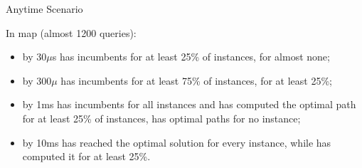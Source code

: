\begin{frame}{Anytime Scenario}

    In  map (almost 1200 queries):

    \begin{itemize}
        \item by 30$\mu$s \anytimeCPDSearch{} has incumbents for at least 25\% of instances, \AWA{} for almost none;
        \item by 300$\mu$ \anytimeCPDSearch{} has incumbents for at least 75\% of instances, \AWA{} for at least 25\%;
        \item by 1ms \anytimeCPDSearch{} has incumbents for all instances and has computed the optimal path for at least 25\% of instances, \AWA{} has optimal paths for no instance;
        \item by 10ms \anytimeCPDSearch{} has reached the optimal solution for every instance, while \AWA{} has computed it for at least 25\%.
    \end{itemize}
\end{frame}
